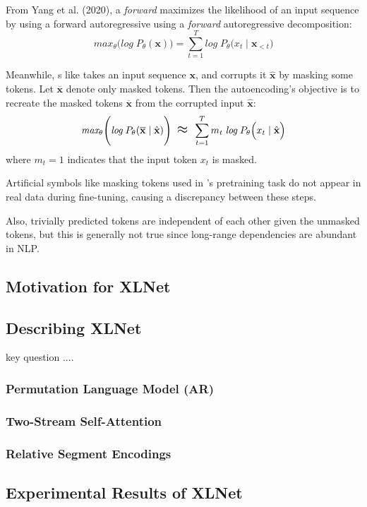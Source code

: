 From Yang et al. (2020), a \emph{forward}  maximizes the likelihood of an input sequence by using a forward autoregressive using a \emph{forward} autoregressive decomposition: 
$$
\textit{max}_\theta \Bigg( \textit{log}  \; P_\theta(\textbf{x})  \Bigg) = \sum_{t=1}^T \textit{log} \; P_\theta \Big(x_t \; | \; \textbf{x}_{< t} \Big)  
$$

Meanwhile, s like  takes an input sequence $\textbf{x}$, and corrupts it $\hat{\textbf{x}}$ by masking some tokens. Let $\overline{\textbf{x}}$ denote only masked tokens. Then the autoencoding's objective is to recreate the masked tokens $\overline{\textbf{x}}$ from the corrupted input $\hat{\textbf{x}}$: 
$$
\textit{max}_\theta \Bigg( \textit{log}  \; P_\theta(\overline{\textbf{x}} \; | \; \hat{\textbf{x}})  \Bigg) \;\; \mathlarger{\mathlarger{\approx}} \;\; \sum_{t=1}^T m_t \; \textit{log} \; P_\theta \Big(x_t \; | \; \hat{\textbf{x}} \Big) 
$$
where $m_t = 1$ indicates that the input token $x_t$ is masked. 



Artificial symbols like masking tokens used in 's pretraining  task do not appear in real data during fine-tuning, causing a discrepancy between these steps. 


Also,  trivially predicted tokens are independent of each other given the unmasked tokens, but this is generally not true since long-range dependencies are abundant in NLP. 


\subsection{Motivation for XLNet}

\subsection{Describing XLNet}

key question ....



\subsubsection{Permutation Language Model (AR)}

\subsubsection{Two-Stream Self-Attention }


\subsubsection{Relative Segment Encodings}


\subsection{Experimental Results of XLNet}